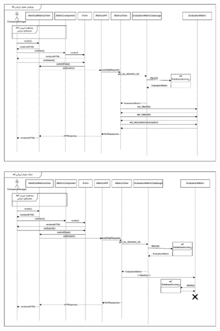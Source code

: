 \eject \pdfpagewidth=12in \pdfpageheight=11in

\begin{figure}[ht!]
	\centering
	\includegraphics[scale=0.8]{figs/design-sequence/3-28.pdf}
\end{figure}
\FloatBarrier
\newpage

\eject \pdfpagewidth=12in \pdfpageheight=11in
\begin{figure}[ht!]
	\centering
	\includegraphics[scale=0.8]{figs/design-sequence/3-29.pdf}
\end{figure}
\FloatBarrier
\newpage

\eject \pdfpagewidth=10in \pdfpageheight=9in


